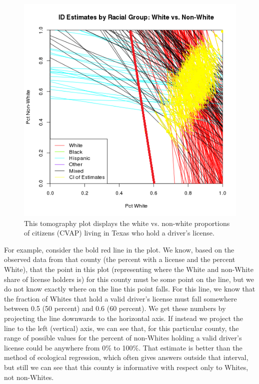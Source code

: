 \documentclass[12pt]{article}
\begin{document}
\begin{figure}[htb]
\begin{centering}
\includegraphics[scale=.75]{figs/CVAP_f3_dl_white_ex.png}
\caption{\label{tomog}This tomography plot displays the white vs. non-white proportions of citizens (CVAP)
living in Texas who hold a driver's license.}
\end{centering}
\end{figure}

For example, consider the bold red line in the plot. We know, based
on the observed data from that county (the percent with a license and the
percent White), that the point in this plot (representing where the
White and non-White share of license holders is) for this county must be some
point on the line, but we do not know exactly where on the line this
point falls. For this line, we know that the fraction of Whites that
hold a valid driver's license must fall somewhere between 0.5 (50
percent) and 0.6 (60 percent). We get these numbers by projecting the
line downwards to the horizontal axis. If instead we project the line
to the left (vertical) axis, we can see that, for this particular
county, the range of possible values for the percent of non-Whites
holding a valid driver's license could be anywhere from 0\% to 100\%.
That estimate is better than the method of ecological regression,
which often gives answers outside that interval, but still we can see
that this county is informative with respect only to Whites, not
non-Whites. 
\end{document}
